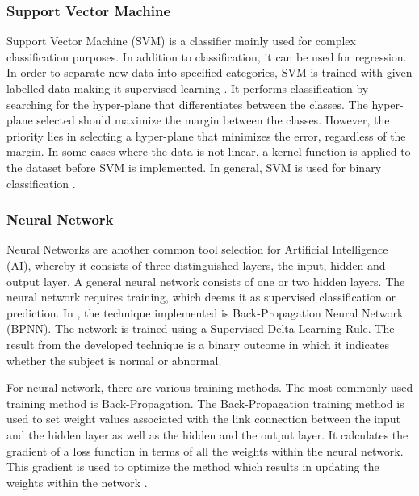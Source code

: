 \documentclass[11pt]{article}
\begin{document}
	\subsubsection{Support Vector Machine}
	Support Vector Machine (SVM) is a classifier mainly used for complex classification purposes. In addition to classification, it can be used for regression. In order to separate new data into specified categories, SVM is trained with given labelled data making it supervised learning \cite{saha_classifying_2016}. It performs classification by searching for the hyper-plane that differentiates between the classes. The hyper-plane selected should maximize the margin between the classes. However, the priority lies in selecting a hyper-plane that minimizes the error, regardless of the margin. 
	In some cases where the data is not linear, a kernel function is applied to the dataset before SVM is implemented. In general, SVM is used for binary classification \cite{Rebentrost2014}.
	
	\subsubsection{Neural Network}
	Neural Networks are another common tool selection for Artificial Intelligence (AI), whereby it consists of three distinguished layers, the input, hidden and output layer. A general neural network consists of one or two hidden layers. The neural network requires training, which deems it as supervised classification or prediction. In \cite{jyothi_congenital_2016}, the technique implemented is Back-Propagation Neural Network (BPNN). The network is trained using a Supervised Delta Learning Rule. The result from the developed technique is a binary outcome in which it indicates whether the subject is normal or abnormal.
	
	For neural network, there are various training methods. The most commonly used training method is Back-Propagation. The Back-Propagation training method is used to set weight values associated with the link connection between the input and the hidden layer as well as the hidden and the output layer. It calculates the gradient of a loss function in terms of all the weights within the neural network. This gradient is used to optimize the method which results in updating the weights within the network \cite{Oukrich2016}.
	
\end{document}
